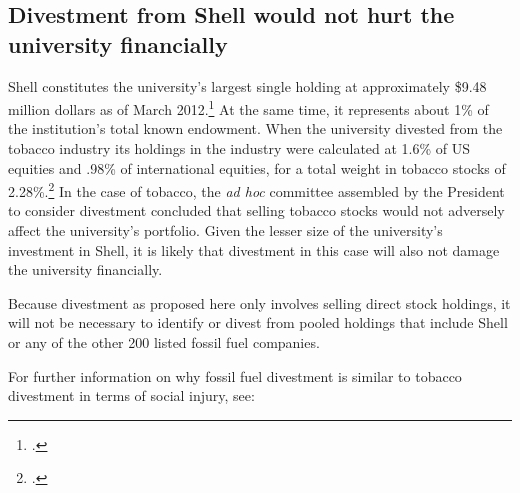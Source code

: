 	\subsection{Divestment from Shell would not hurt the university financially}
	\label{sec:ShellNotFinancialHurt}



Shell constitutes the university's largest single holding at approximately \$9.48 million dollars as of March 2012.\footcite[][]{UTAM_2012}  
At the same time, it represents about 1\% of the institution's total known endowment.
When the university divested from the tobacco industry its holdings in the industry were calculated at 1.6\% of US equities and .98\% of international equities, for a total weight in tobacco stocks of 2.28\%.\footcite[][]{TobaccoReport_2007}
In the case of tobacco, the \emph{ad hoc} committee assembled by the President to consider divestment concluded that selling tobacco stocks  would not adversely affect the university's portfolio. 
Given the lesser size of the university's investment in Shell, it is likely that divestment in this case will also not damage the university financially.



Because divestment as proposed here only involves selling direct stock holdings, it will not be necessary to identify or divest from pooled holdings that include Shell or any of the other 200 listed fossil fuel companies.



For further information on why fossil fuel divestment is similar to tobacco divestment in terms of social injury, see: 



